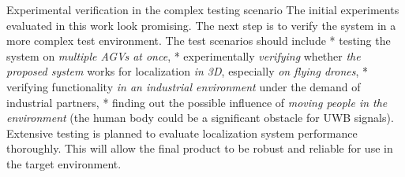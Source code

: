 \secc Experimental verification in the complex testing scenario
The initial experiments evaluated in this work look promising. The next step is to verify the system in a more complex test environment. The test scenarios should include
	\begitems
	* testing the system on {\it multiple AGVs at once}, 
	* experimentally {\it verifying} whether {\it the proposed system} works for localization {\it in 3D}, especially {\it on flying drones},
	* verifying functionality {\it in an industrial environment} under the demand of industrial partners,
	* finding out the possible influence of {\it moving people in the environment} (the human body could be a significant obstacle for UWB signals).
	\enditems
Extensive testing is planned to evaluate localization system performance thoroughly. This will allow the final product to be robust and reliable for use in the target environment.







